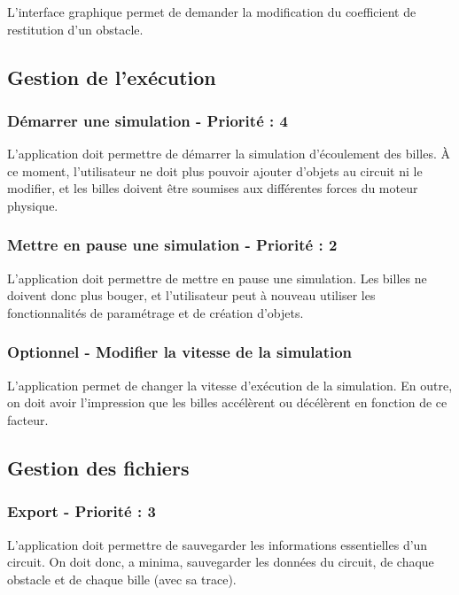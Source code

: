 \documentclass{report}
\begin{document}
L’interface graphique permet de demander la modification du coefficient de restitution d’un obstacle.

\subsection{Gestion de l'exécution}

\subsubsection{Démarrer une simulation - Priorité : 4}

L’application doit permettre de démarrer la simulation d’écoulement des billes. À ce moment, l’utilisateur ne doit plus pouvoir ajouter d’objets au circuit ni le modifier, et les billes doivent être soumises aux différentes forces du moteur physique.

\subsubsection{Mettre en pause une simulation - Priorité : 2}

L’application doit permettre de mettre en pause une simulation. Les billes ne doivent donc plus bouger, et l’utilisateur peut à nouveau utiliser les fonctionnalités de paramétrage et de création d’objets.

\subsubsection{Optionnel - Modifier la vitesse de la simulation}

L’application permet de changer la vitesse d’exécution de la simulation. En outre, on doit avoir l’impression que les billes accélèrent ou décélèrent en fonction de ce facteur.

\subsection{Gestion des fichiers}

\subsubsection{Export - Priorité : 3}

L’application doit permettre de sauvegarder les informations essentielles d’un circuit. On doit donc, a minima, sauvegarder les données du circuit, de chaque obstacle et de chaque bille (avec sa trace).
\end{document}
